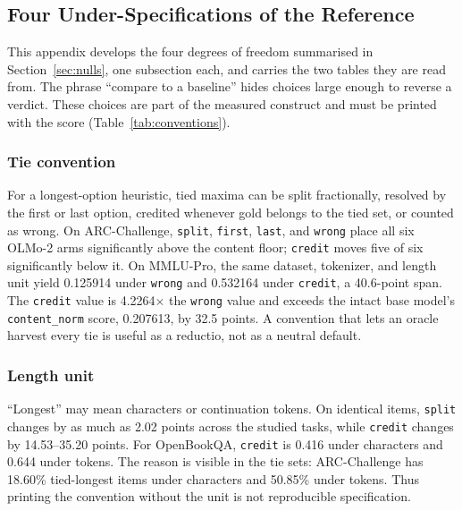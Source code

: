 \subsection{Four Under-Specifications of the Reference}
\label{app:nulls}

This appendix develops the four degrees of freedom summarised in Section~\ref{sec:nulls}, one subsection each, and carries the two tables they are read from. The phrase ``compare to a baseline'' hides choices large enough to reverse a verdict. These choices are part of the measured construct and must be printed with the score (Table~\ref{tab:conventions}).

\subsubsection{Tie convention}

For a longest-option heuristic, tied maxima can be split fractionally, resolved by the first or last option, credited whenever gold belongs to the tied set, or counted as wrong. On ARC-Challenge, \texttt{split}, \texttt{first}, \texttt{last}, and \texttt{wrong} place all six OLMo-2 arms significantly above the content floor; \texttt{credit} moves five of six significantly below it. On MMLU-Pro, the same dataset, tokenizer, and length unit yield 0.125914 under \texttt{wrong} and 0.532164 under \texttt{credit}, a 40.6-point span. The \texttt{credit} value is 4.2264$\times$ the \texttt{wrong} value and exceeds the intact base model's \texttt{content\_norm} score, 0.207613, by 32.5 points. A convention that lets an oracle harvest every tie is useful as a reductio, not as a neutral default.

\subsubsection{Length unit}

``Longest'' may mean characters or continuation tokens. On identical items, \texttt{split} changes by as much as 2.02 points across the studied tasks, while \texttt{credit} changes by 14.53--35.20 points. For OpenBookQA, \texttt{credit} is 0.416 under characters and 0.644 under tokens. The reason is visible in the tie sets: ARC-Challenge has 18.60\% tied-longest items under characters and 50.85\% under tokens. Thus printing the convention without the unit is not reproducible specification.

